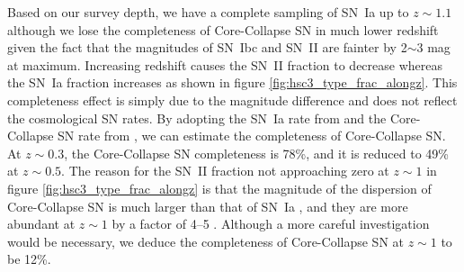 \documentclass[useamsfonts]{pasj01}
\begin{document}
Based on our survey depth, we have a complete sampling of SN~Ia up to $z\sim1.1$ although we lose the completeness of Core-Collapse SN in much lower redshift given the fact that the magnitudes of SN~Ibc and SN~II are fainter by 2$\sim$3 mag at maximum.
Increasing redshift causes the SN~II fraction to decrease whereas the SN~Ia fraction increases as shown in figure \ref{fig:hsc3_type_frac_alongz}. 
This completeness effect is simply due to the magnitude difference and does not reflect the cosmological SN rates.
By adopting the SN~Ia rate from \citet{graur14a} and the Core-Collapse SN rate from \citet{strolger15a}, we can estimate the completeness of Core-Collapse SN. 
At $z\sim0.3$, the Core-Collapse SN completeness is 78\%, and it is reduced to 49\% at $z\sim0.5$. 
The reason for the SN~II fraction not approaching zero at $z\sim1$ in figure \ref{fig:hsc3_type_frac_alongz} is that the magnitude of the dispersion of Core-Collapse SN \citep[$\sigma$ $\sim$ 1.2 mag]{li11a,kessler19b} is much larger than that of SN~Ia \citep[$\sigma$ $\sim$ 0.5 mag]{rubin15a}, and they are more abundant at $z\sim1$ by a factor of 4--5 \citep{madau98a,hounsell18a}. 
Although a more careful investigation would be necessary, we deduce the completeness of Core-Collapse SN at $z\sim1$ to be 12\%.

%
%
%
\end{document}
